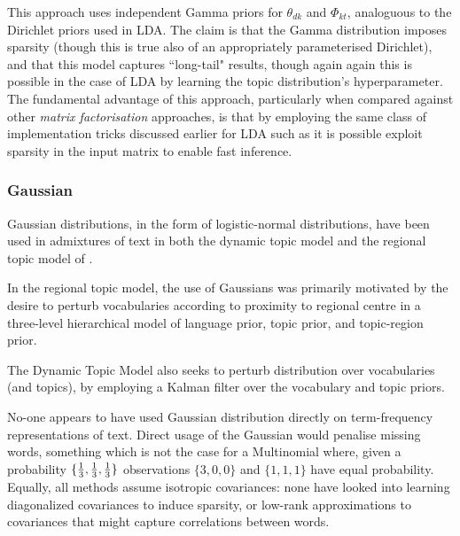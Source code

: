 This approach uses independent Gamma priors for $\theta_{dk}$ and $\Phi_{kt}$, analoguous to the Dirichlet priors used in LDA. The claim is that the Gamma distribution imposes sparsity (though this is true also of an appropriately parameterised Dirichlet), and that this model captures ``long-tail" results, though again again this is possible in the case of LDA by learning the topic distribution's hyperparameter\cite{Wallach2009a}. The fundamental advantage of this approach, particularly when compared against other \emph{matrix factorisation} approaches, is that by employing the same class of implementation tricks discussed earlier for LDA such as \cite{Mimno2012a} it is possible exploit sparsity in the input matrix to enable fast inference.

\subsubsection*{Gaussian}

Gaussian distributions, in the form of logistic-normal distributions, have been used in admixtures of text in both the dynamic topic model\cite{Blei2006a} and the regional topic model of \cite{Eisenstein2010}.

In the regional topic model, the use of Gaussians was primarily motivated by the desire to perturb vocabularies according to proximity to regional centre in a three-level hierarchical model of language prior, topic prior, and topic-region prior.

The Dynamic Topic Model also seeks to perturb distribution over vocabularies (and topics), by employing a Kalman filter over the vocabulary and topic priors.

No-one appears to have used Gaussian distribution directly on term-frequency representations of text. Direct usage of the Gaussian would penalise missing words, something which is not the case for a Multinomial where, given a probability $\{\frac{1}{ {3} }, \frac{1}{ {3} }, \frac{1}{ {3} }\}$ observations $\{3,0,0\}$ and $\{1,1,1\}$ have equal probability. Equally, all methods assume isotropic covariances: none have looked into learning diagonalized covariances to induce sparsity, or low-rank approximations to covariances that might capture correlations between words.

